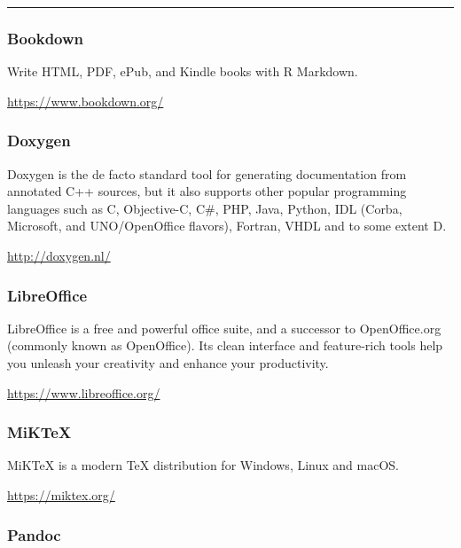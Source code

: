 \documentclass[
]{book}
\theoremstyle{definition}
\theoremstyle{definition}
\theoremstyle{definition}
\theoremstyle{definition}
\theoremstyle{remark}
\begin{document}
\begin{center}\rule{0.5\linewidth}{0.5pt}\end{center}

\hypertarget{bookdown}{%
\subsubsection*{Bookdown}\label{bookdown}}

Write HTML, PDF, ePub, and Kindle books with R Markdown.

\url{https://www.bookdown.org/}

\hypertarget{doxygen}{%
\subsubsection*{Doxygen}\label{doxygen}}

Doxygen is the de facto standard tool for generating documentation from annotated C++ sources, but it also supports other popular programming languages such as C, Objective-C, C\#, PHP, Java, Python, IDL (Corba, Microsoft, and UNO/OpenOffice flavors), Fortran, VHDL and to some extent D.

\url{http://doxygen.nl/}

\hypertarget{libreoffice}{%
\subsubsection*{LibreOffice}\label{libreoffice}}

LibreOffice is a free and powerful office suite, and a successor to OpenOffice.org (commonly known as OpenOffice). Its clean interface and feature-rich tools help you unleash your creativity and enhance your productivity.

\url{https://www.libreoffice.org/}

\hypertarget{miktex}{%
\subsubsection*{MiKTeX}\label{miktex}}

MiKTeX is a modern TeX distribution for Windows, Linux and macOS.

\url{https://miktex.org/}

\hypertarget{pandoc}{%
\subsubsection*{Pandoc}\label{pandoc}}
\end{document}
